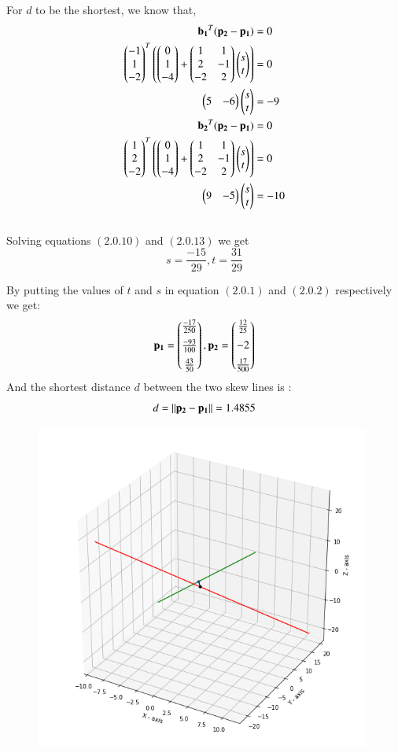 \documentclass[journal,12pt,twocolumn]{IEEEtran}
\begin{document}
For $d$ to be the shortest, we know that,
\begin{align}
\mathbf{b_1}^T(\mathbf{p_2}-\mathbf{p_1})&=0\\
\begin{pmatrix}-1\\1\\-2\end{pmatrix}^T  \left(\begin{pmatrix}0\\1\\-4\end{pmatrix}+\begin{pmatrix}1&1\\2&-1\\-2&2\end{pmatrix} \begin{pmatrix}s\\t\end{pmatrix}\right)&=0\\
\begin{pmatrix}5&-6\end{pmatrix}\begin{pmatrix}s\\t\end{pmatrix}&=-9\\
\mathbf{b_2}^T(\mathbf{p_2}-\mathbf{p_1})&=0\\
\begin{pmatrix}1\\2\\-2\end{pmatrix}^T  \left(\begin{pmatrix}0\\1\\-4\end{pmatrix}+\begin{pmatrix}1&1\\2&-1\\-2&2\end{pmatrix} \begin{pmatrix}s\\t\end{pmatrix}\right)&=0\\
\begin{pmatrix}9&-5\end{pmatrix}\begin{pmatrix}s\\t\end{pmatrix}&=-10
\end{align}\\
Solving equations $(2.0.10)$ and $(2.0.13)$ we get
$$s=\frac{-15}{29}, t=\frac{31}{29}$$

By putting the values of $t$ and $s$ in equation $(2.0.1)$ and $(2.0.2)$ respectively we get:
\begin{align}
    \mathbf{p_1}=\begin{pmatrix}\frac{-17}{250}\\[0.2cm]\frac{-93}{100}\\[0.2cm]\frac{43}{50}\end{pmatrix},\mathbf{p_2}=\begin{pmatrix}\frac{12}{25}\\[0.2cm]-2\\[0.2cm]\frac{17}{500}\end{pmatrix}
\end{align}
And the shortest distance $d$ between the two skew lines is :
$$d=\left\lVert\mathbf{p_2}-\mathbf{p_1}\right\rVert=1.4855$$
\begin{figure}[h]
    \includegraphics[width=11cm]{assignment2.png}
\end{figure}
\end{document}
